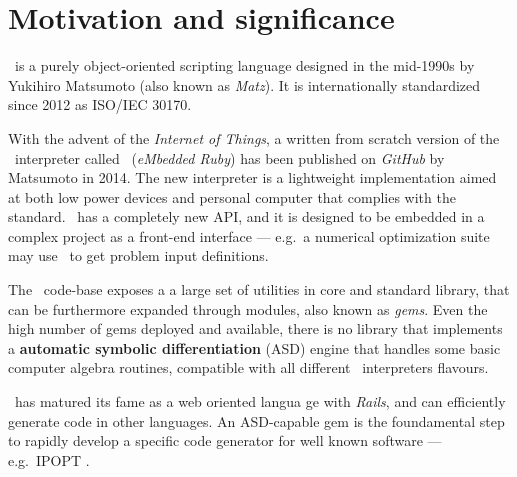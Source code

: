 
\section{Motivation and significance}
\label{sec:motivation}

\Ruby \cite{flanagan2008ruby}~is a purely object-oriented scripting language designed in the mid-1990s by Yukihiro Matsumoto (also known as \emph{Matz}). It is internationally standardized since 2012 as ISO/IEC 30170.

With the advent of the \emph{Internet of Things}, a written from scratch version of the \Ruby~interpreter called \Mruby~(\emph{eMbedded Ruby}) \cite{tanaka2015mruby} has been published on \emph{GitHub} by Matsumoto in 2014. The new interpreter is a lightweight implementation aimed at both low power devices and personal computer that complies with the standard\cite{iso30170}. \Mruby~has a completely new API, and it is designed to be embedded in a complex project as a front-end interface --- e.g.\ a numerical optimization suite may use \Mruby~to get problem input definitions.

The \Ruby~code-base exposes a a large set of utilities in core and standard library, that can be furthermore expanded through modules, also known as \emph{gems}. Even the high number of gems deployed and available, there is no library that implements a \textbf{automatic symbolic differentiation} (ASD) \cite{tolsma1998computational} engine that handles some basic computer algebra routines, compatible with all different \Ruby~interpreters flavours.

\Ruby~has matured its fame as a web oriented langua
ge with \emph{Rails}, and can efficiently generate code in other languages. An ASD-capable gem is the foundamental step to rapidly develop a specific code generator for well known software --- e.g.\ IPOPT \cite{wachter2009ipopt}\@.

